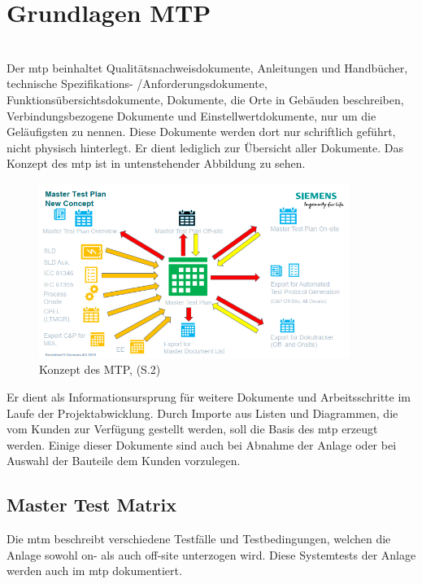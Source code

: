 \section{Grundlagen MTP}
\label{sec:mtp}
 \cite{2}\\
Der \ac{mtp} beinhaltet Qualitätsnachweisdokumente, Anleitungen und Handbücher, technische Spezifikations- /Anforderungsdokumente, Funktionsübersichtsdokumente, Dokumente, die Orte in Gebäuden beschreiben, Verbindungsbezogene Dokumente und Einstellwertdokumente, nur um die Geläufigsten zu nennen.
Diese Dokumente werden dort nur schriftlich geführt, nicht physisch hinterlegt. Er dient lediglich zur Übersicht aller Dokumente.
Das Konzept des \ac{mtp} ist in untenstehender Abbildung zu sehen.
\begin{figure}[H]
   \begin{center}
   \includegraphics[width=0.9\textwidth]{Bilder/mtp} 
   \caption{Konzept des MTP, \cite{9}(S.2)} 
   \label{fig:struktur} 
   \end{center}
\end{figure}
Er dient als Informationsursprung für weitere Dokumente und Arbeitsschritte im Laufe der Projektabwicklung. Durch Importe aus Listen und Diagrammen, die vom Kunden zur Verfügung gestellt werden, soll die Basis des \ac{mtp} erzeugt  werden. Einige dieser Dokumente sind auch bei Abnahme der Anlage oder bei Auswahl der Bauteile dem Kunden vorzulegen.
\subsection{Master Test Matrix}
\label{sub:mtm}
Die \ac{mtm} beschreibt verschiedene Testfälle und Testbedingungen, welchen die Anlage sowohl on- als auch off-site unterzogen wird. 
Diese Systemtests der Anlage werden auch im \ac{mtp} dokumentiert.

